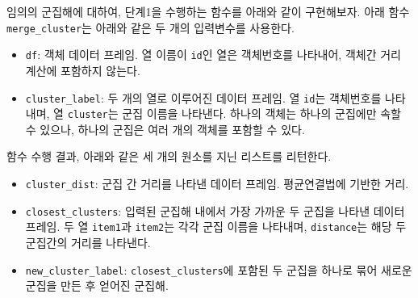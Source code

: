 \documentclass[]{book}
\providecommand{\tightlist}{%
  \setlength{\itemsep}{0pt}\setlength{\parskip}{0pt}}
\begin{document}
임의의 군집해에 대하여, 단계1을 수행하는 함수를 아래와 같이 구현해보자. 아래 함수 \texttt{merge\_cluster}는 아래와 같은 두 개의 입력변수를 사용한다.

\begin{itemize}
\tightlist
\item
  \texttt{df}: 객체 데이터 프레임. 열 이름이 \texttt{id}인 열은 객체번호를 나타내어, 객체간 거리 계산에 포함하지 않는다.
\item
  \texttt{cluster\_label}: 두 개의 열로 이루어진 데이터 프레임. 열 \texttt{id}는 객체번호를 나타내며, 열 \texttt{cluster}는 군집 이름을 나타낸다. 하나의 객체는 하나의 군집에만 속할 수 있으나, 하나의 군집은 여러 개의 객체를 포함할 수 있다.
\end{itemize}

함수 수행 결과, 아래와 같은 세 개의 원소를 지닌 리스트를 리턴한다.

\begin{itemize}
\tightlist
\item
  \texttt{cluster\_dist}: 군집 간 거리를 나타낸 데이터 프레임. 평균연결법에 기반한 거리.
\item
  \texttt{closest\_clusters}: 입력된 군집해 내에서 가장 가까운 두 군집을 나타낸 데이터 프레임. 두 열 \texttt{item1}과 \texttt{item2}는 각각 군집 이름을 나타내며, \texttt{distance}는 해당 두 군집간의 거리를 나타낸다.
\item
  \texttt{new\_cluster\_label}: \texttt{closest\_clusters}에 포함된 두 군집을 하나로 묶어 새로운 군집을 만든 후 얻어진 군집해.
\end{itemize}
\end{document}
